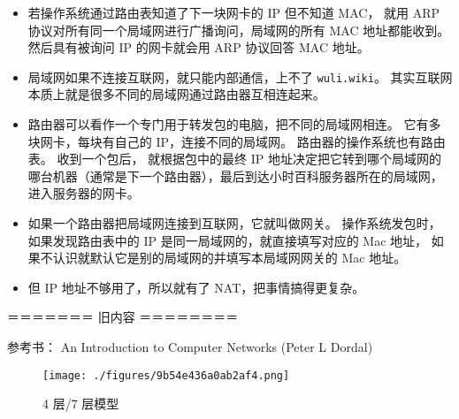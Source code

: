 \begin{itemize}
\item 若操作系统通过路由表知道了下一块网卡的 IP 但不知道 MAC， 就用 ARP 协议对所有同一个局域网进行广播询问，局域网的所有 MAC 地址都能收到。 然后具有被询问 IP 的网卡就会用 ARP 协议回答 MAC 地址。
\item 局域网如果不连接互联网，就只能内部通信，上不了 \verb`wuli.wiki`。 其实互联网本质上就是很多不同的局域网通过路由器互相连起来。
\item 路由器可以看作一个专门用于转发包的电脑，把不同的局域网相连。 它有多块网卡，每块有自己的 IP，连接不同的局域网。 路由器的操作系统也有路由表。 收到一个包后， 就根据包中的最终 IP 地址决定把它转到哪个局域网的哪台机器（通常是下一个路由器），最后到达小时百科服务器所在的局域网， 进入服务器的网卡。
\item 如果一个路由器把局域网连接到互联网，它就叫做网关。 操作系统发包时，如果发现路由表中的 IP 是同一局域网的，就直接填写对应的 Mac 地址， 如果不认识就默认它是别的局域网的并填写本局域网网关的 Mac 地址。
\item 但 IP 地址不够用了，所以就有了 NAT，把事情搞得更复杂。
\end{itemize}


＝＝＝＝＝＝＝ 旧内容 ＝＝＝＝＝＝＝＝

参考书： An Introduction to Computer Networks (Peter L Dordal)

\begin{figure}[ht]
\centering
\texttt{[image: ./figures/9b54e436a0ab2af4.png]}
\caption{4 层/7 层模型} \label{fig_NetNt_1}
\end{figure}

